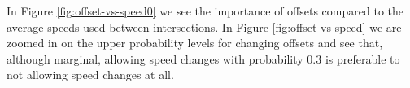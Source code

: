 In Figure \ref{fig:offset-vs-speed0} we see the importance of offsets compared to the average speeds used between intersections. In Figure \ref{fig:offset-vs-speed} we are zoomed in on the upper probability levels for changing offsets and see that, although marginal, allowing speed changes with probability $0.3$ is preferable to not allowing speed changes at all.